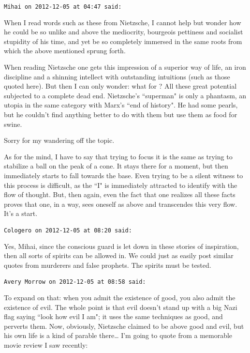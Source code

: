 \begin{footnotesize}\begin{sffamily}

\texttt{Mihai on 2012-12-05 at 04:47 said: }

When I read words such as these from Nietzsche, I cannot help but wonder how he could be so unlike and above the mediocrity, bourgeois pettiness and socialist stupidity of his time, and yet be so completely immersed in the same roots from which the above mentioned sprung forth. 

When reading Nietzsche one gets this impression of a superior way of life, an iron discipline and a shinning intellect with outstanding intuitions (such as those quoted here). But then I can only wonder: what for ? All these great potential subjected to a complete dead end. Nietzsche's ``superman" is only a phantasm, an utopia in the same category with Marx's ``end of history". He had some pearls, but he couldn't find anything better to do with them but use them as food for swine. 

Sorry for my wandering off the topic. 

As for the mind, I have to say that trying to focus it is the same as trying to stabilize a ball on the peak of a cone. It stays there for a moment, but then immediately starts to fall towards the base. Even trying to be a silent witness to this process is difficult, as the ``I" is immediately attracted to identify with the flow of thought. But, then again, even the fact that one realizes all these facts proves that one, in a way, sees oneself as above and transcendes this very flow. It's a start.


\hfill

\texttt{Cologero on 2012-12-05 at 08:20 said: }

Yes, Mihai, since the conscious guard is let down in these stories of inspiration, then all sorts of spirits can be allowed in. We could just as easily post similar quotes from murderers and false prophets. The spirits must be tested.


\hfill

\texttt{Avery Morrow on 2012-12-05 at 08:58 said: }

To expand on that: when you admit the existence of good, you also admit the existence of evil. The whole point is that evil doesn't stand up with a big Nazi flag saying ``look how evil I am"; it uses the same techniques as good, and perverts them. Now, obviously, Nietzsche claimed to be above good and evil, but his own life is a kind of parable there… I'm going to quote from a memorable movie review I saw recently:


\end{sffamily}
\end{footnotesize}
